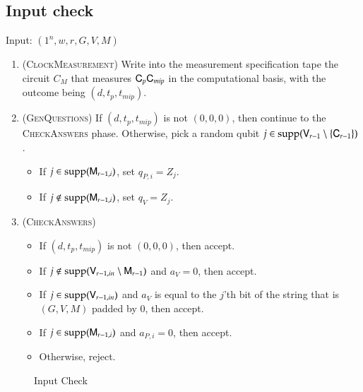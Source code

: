 \subsection{Input check}
\label{sec:input_check}


\vspace{10pt}
\begin{center}
\begin{mdframed}
    Input: $(1^n,w,r,G,V,M)$
    
	\begin{enumerate}
		\item (\textsc{ClockMeasurement}) Write into the measurement specification tape the circuit $C_M$ that measures ${\mathsf{C}}_p {\mathsf{C}}_{mip}$ in the computational basis, with the outcome being $(d,t_p,t_{mip})$.
		\item (\textsc{GenQuestions}) If $(d,t_p,t_{mip})$ is not $(0,0,0)$, then continue to the \textsc{CheckAnswers} phase. Otherwise, pick a random qubit $j \in \operatorname{supp}({\mathsf{V}}_{r-1} \setminus \{{\mathsf{C}}_{r-1} \})$. 
		\begin{itemize}
			\item If $j \in \operatorname{supp}({\mathsf{M}}_{r-1,i})$, set $q_{P,i} = Z_j$.
			\item If $j \notin \operatorname{supp}({\mathsf{M}}_{r-1,i})$, set $q_V = Z_j$.
		\end{itemize}
		
		\item (\textsc{CheckAnswers}) 
		\begin{itemize}
			\item If $(d,t_p,t_{mip})$ is not $(0,0,0)$, then accept. 
			\item If $j \notin \operatorname{supp}({\mathsf{V}}_{r-1,in} \setminus {\mathsf{M}}_{r-1})$ and $a_V = 0$, then accept. 
			\item If $j \in \operatorname{supp}({\mathsf{V}}_{r-1,in})$ and $a_V$ is equal to the $j$'th bit of the string that is $(G,V,M)$ padded by $0$, then accept. 
			\item If $j \in \operatorname{supp}({\mathsf{M}}_{r-1,i})$ and $a_{P,i} = 0$, then accept.
			\item Otherwise, reject.
		\end{itemize}
	\end{enumerate}    
\end{mdframed}
\end{center}
\begin{figure}[H]
\caption{Input Check}
\label{fig:input_check}
\end{figure}

